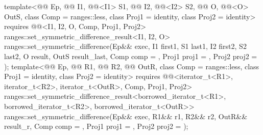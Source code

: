 \begin{itemdecl}
template<@@ Ep, @@ I1, @@<I1> S1,
         @@ I2, @@<I2> S2,
         @@ O, @@<O> OutS, class Comp = ranges::less,
         class Proj1 = identity, class Proj2 = identity>
  requires @@<I1, I2, O, Comp, Proj1, Proj2>
  ranges::set_symmetric_difference_result<I1, I2, O>
    ranges::set_symmetric_difference(Ep&& exec, I1 first1, S1 last1,
                                     I2 first2, S2 last2, O result, OutS result_last,
                                     Comp comp = {}, Proj1 proj1 = {}, Proj2 proj2 = {});
template<@@ Ep, @@ R1, @@ R2,
         @@ OutR, class Comp = ranges::less,
         class Proj1 = identity, class Proj2 = identity>
  requires @@<iterator_t<R1>, iterator_t<R2>, iterator_t<OutR>, Comp, Proj1, Proj2>
  ranges::set_symmetric_difference_result<borrowed_iterator_t<R1>, borrowed_iterator_t<R2>,
                                          borrowed_iterator_t<OutR>>
    ranges::set_symmetric_difference(Ep&& exec, R1&& r1, R2&& r2, OutR&& result_r,
                                     Comp comp = {}, Proj1 proj1 = {}, Proj2 proj2 = {});
\end{itemdecl}

